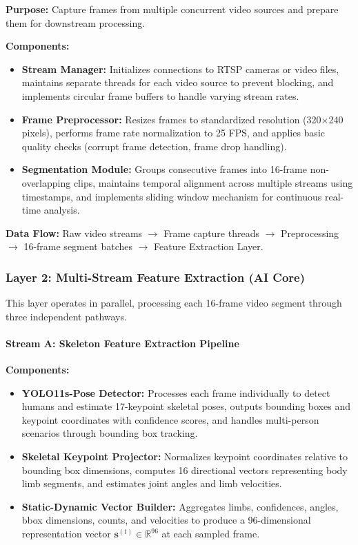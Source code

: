 \documentclass[12pt]{article}
\begin{document}
\textbf{Purpose:} Capture frames from multiple concurrent video sources and prepare them for downstream processing.

\textbf{Components:}
\begin{itemize}
    \item \textbf{Stream Manager:} Initializes connections to RTSP cameras or video files, maintains separate threads for each video source to prevent blocking, and implements circular frame buffers to handle varying stream rates.
    
    \item \textbf{Frame Preprocessor:} Resizes frames to standardized resolution (320$\times$240 pixels), performs frame rate normalization to 25 FPS, and applies basic quality checks (corrupt frame detection, frame drop handling).
    
    \item \textbf{Segmentation Module:} Groups consecutive frames into 16-frame non-overlapping clips, maintains temporal alignment across multiple streams using timestamps, and implements sliding window mechanism for continuous real-time analysis.
\end{itemize}

\textbf{Data Flow:} Raw video streams $\rightarrow$ Frame capture threads $\rightarrow$ Preprocessing $\rightarrow$ 16-frame segment batches $\rightarrow$ Feature Extraction Layer.

\subsubsection{Layer 2: Multi-Stream Feature Extraction (AI Core)}

This layer operates in parallel, processing each 16-frame video segment through three independent pathways.

\paragraph{Stream A: Skeleton Feature Extraction Pipeline}

\textbf{Components:}
\begin{itemize}
    \item \textbf{YOLO11s-Pose Detector:} Processes each frame individually to detect humans and estimate 17-keypoint skeletal poses, outputs bounding boxes and keypoint coordinates with confidence scores, and handles multi-person scenarios through bounding box tracking.
    
    \item \textbf{Skeletal Keypoint Projector:} Normalizes keypoint coordinates relative to bounding box dimensions, computes 16 directional vectors representing body limb segments, and estimates joint angles and limb velocities.
    
    \item \textbf{Static-Dynamic Vector Builder:} Aggregates limbs, confidences, angles, bbox dimensions, counts, and velocities to produce a 96-dimensional representation vector $\mathbf{s}^{(t)} \in \mathbb{R}^{96}$ at each sampled frame.
\end{itemize}
\end{document}
